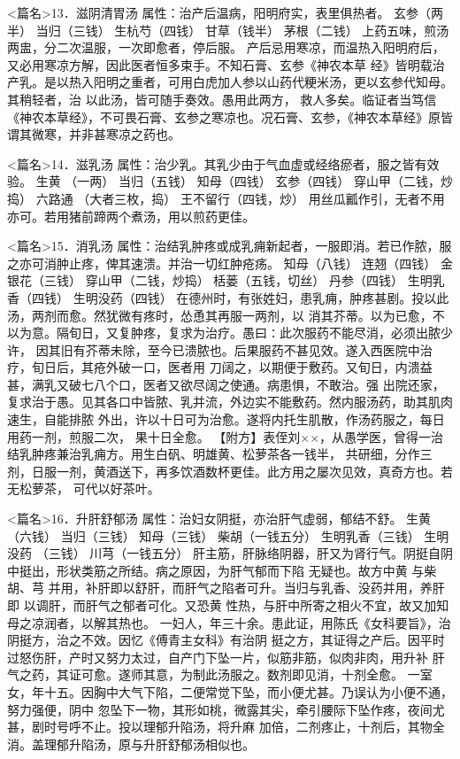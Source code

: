 \documentclass[a4paper,12pt,UTF8,twoside]{ctexbook}
\begin{document}
<篇名>13．滋阴清胃汤
属性：治产后温病，阳明府实，表里俱热者。 
玄参（两半） 当归（三钱） 生杭芍（四钱） 甘草（钱半） 茅根（二钱） 
上药五味，煎汤两盅，分二次温服，一次即愈者，停后服。 
产后忌用寒凉，而温热入阳明府后，又必用寒凉方解，因此医者恒多束手。不知石膏、玄参《神农本草 
经》皆明载治产乳。是以热入阳明之重者，可用白虎加人参以山药代粳米汤，更以玄参代知母。其稍轻者，治 
以此汤，皆可随手奏效。愚用此两方， 
救人多矣。临证者当笃信《神农本草经》，不可畏石膏、玄参之寒凉也。况石膏、玄参，《神农本草经》原皆 
谓其微寒，并非甚寒凉之药也。 


<篇名>14．滋乳汤
属性：治少乳。其乳少由于气血虚或经络瘀者，服之皆有效验。 
生黄 （一两） 当归（五钱） 知母（四钱） 玄参（四钱） 穿山甲（二钱，炒捣） 六路通 
（大者三枚，捣） 王不留行（四钱，炒） 
用丝瓜瓤作引，无者不用亦可。若用猪前蹄两个煮汤，用以煎药更佳。 


<篇名>15．消乳汤
属性：治结乳肿疼或成乳痈新起者，一服即消。若已作脓，服之亦可消肿止疼，俾其速溃。并治一切红肿疮疡。 
知母（八钱） 连翘（四钱） 金银花（三钱） 穿山甲（二钱，炒捣） 栝蒌（五钱，切丝） 丹参（四钱） 
生明乳香（四钱） 生明没药（四钱） 
在德州时，有张姓妇，患乳痈，肿疼甚剧。投以此汤，两剂而愈。然犹微有疼时，怂恿其再服一两剂，以 
消其芥蒂。以为已愈，不以为意。隔旬日，又复肿疼，复求为治疗。愚曰∶此次服药不能尽消，必须出脓少许， 
因其旧有芥蒂未除，至今已溃脓也。后果服药不甚见效。遂入西医院中治疗，旬日后，其疮外破一口，医者用 
刀阔之，以期便于敷药。又旬日，内溃益甚，满乳又破七八个口，医者又欲尽阔之使通。病患惧，不敢治。强 
出院还家，复求治于愚。见其各口中皆脓、乳并流，外边实不能敷药。然内服汤药，助其肌肉速生，自能排脓 
外出，许以十日可为治愈。遂将内托生肌散，作汤药服之，每日用药一剂，煎服二次， 
果十日全愈。 
【附方】表侄刘××，从愚学医，曾得一治结乳肿疼兼治乳痈方。用生白矾、明雄黄、松萝茶各一钱半， 
共研细，分作三剂，日服一剂，黄酒送下，再多饮酒数杯更佳。此方用之屡次见效，真奇方也。若无松萝茶， 
可代以好茶叶。 


<篇名>16．升肝舒郁汤
属性：治妇女阴挺，亦治肝气虚弱，郁结不舒。 
生黄 （六钱） 当归（三钱） 知母（三钱） 柴胡（一钱五分） 生明乳香（三钱） 生明没药 
（三钱） 川芎（一钱五分） 
肝主筋，肝脉络阴器，肝又为肾行气。阴挺自阴中挺出，形状类筋之所结。病之原因，为肝气郁而下陷 
无疑也。故方中黄 与柴胡、芎 并用，补肝即以舒肝，而肝气之陷者可升。当归与乳香、没药并用，养肝即 
以调肝，而肝气之郁者可化。又恐黄 性热，与肝中所寄之相火不宜，故又加知母之凉润者，以解其热也。 
一妇人，年三十余。患此证，用陈氏《女科要旨》，治阴挺方，治之不效。因忆《傅青主女科》有治阴 
挺之方，其证得之产后。因平时过怒伤肝，产时又努力太过，自产门下坠一片，似筋非筋，似肉非肉，用升补 
肝气之药，其证可愈。遂师其意，为制此汤服之。数剂即见消，十剂全愈。 
一室女，年十五。因胸中大气下陷，二便常觉下坠，而小便尤甚。乃误认为小便不通，努力强便，阴中 
忽坠下一物，其形如桃，微露其尖，牵引腰际下坠作疼，夜间尤甚，剧时号呼不止。投以理郁升陷汤，将升麻 
加倍，二剂疼止，十剂后，其物全消。盖理郁升陷汤，原与升肝舒郁汤相似也。 
\end{document}
